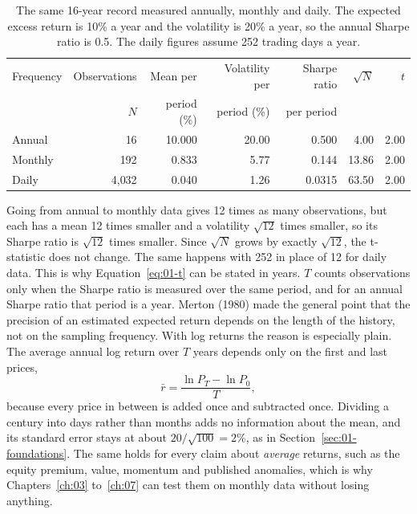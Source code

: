 \begin{table}[htbp]
\centering
\small
\caption{The same 16-year record measured annually, monthly and daily. The expected excess return is 10\% a year and the volatility is 20\% a year, so the annual Sharpe ratio is 0.5. The daily figures assume 252 trading days a year.}
\label{tab:01-frequency}
\begin{tabular}{@{}lrrrrrr@{}}
\toprule
Frequency & Observations & Mean per & Volatility per & Sharpe ratio & $\sqrt{N}$ & $t$ \\
 & $N$ & period (\%) & period (\%) & per period & & \\
\midrule
Annual  & 16    & 10.000 & 20.00 & 0.500  & 4.00  & 2.00 \\
Monthly & 192   & 0.833  & 5.77  & 0.144  & 13.86 & 2.00 \\
Daily   & 4{,}032 & 0.040 & 1.26  & 0.0315 & 63.50 & 2.00 \\
\bottomrule
\end{tabular}
\end{table}

Going from annual to monthly data gives 12 times as many observations, but each has a mean 12 times smaller and a volatility $\sqrt{12}$ times smaller, so its Sharpe ratio is $\sqrt{12}$ times smaller. Since $\sqrt{N}$ grows by exactly $\sqrt{12}$, the t-statistic does not change. The same happens with 252 in place of 12 for daily data. This is why Equation~\eqref{eq:01-t} can be stated in years. $T$ counts observations only when the Sharpe ratio is measured over the same period, and for an annual Sharpe ratio that period is a year. Merton (1980) made the general point that the precision of an estimated expected return depends on the length of the history, not on the sampling frequency. With log returns the reason is especially plain. The average annual log return over $T$ years depends only on the first and last prices,
\begin{equation}
  \bar{r} = \frac{\ln P_T - \ln P_0}{T}, \nonumber
\end{equation}
because every price in between is added once and subtracted once. Dividing a century into days rather than months adds no information about the mean, and its standard error stays at about $20/\sqrt{100} = 2$\%, as in Section~\ref{sec:01-foundations}. The same holds for every claim about \emph{average} returns, such as the equity premium, value, momentum and published anomalies, which is why Chapters~\ref{ch:03} to~\ref{ch:07} can test them on monthly data without losing anything.

